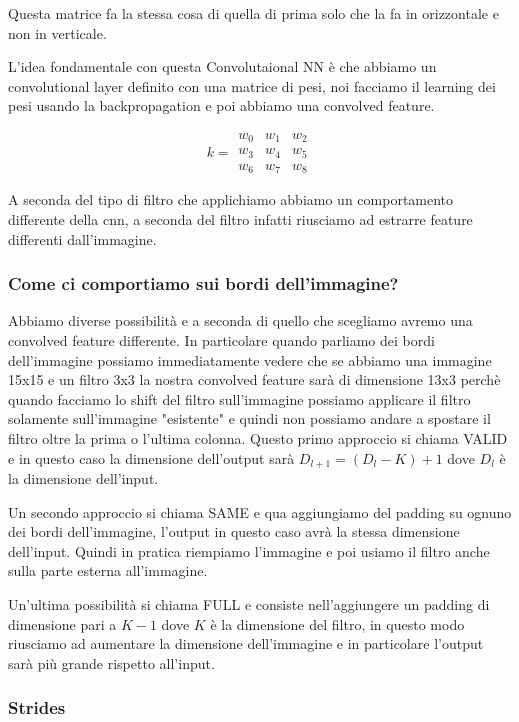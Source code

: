 \documentclass[14pt]{extreport}
\begin{document}
Questa matrice fa la stessa cosa di quella di prima solo che la fa in orizzontale e non in verticale.

L'idea fondamentale con questa Convolutaional NN è che abbiamo un convolutional layer definito con una matrice di pesi, noi facciamo il learning dei
pesi usando la backpropagation e poi abbiamo una convolved feature.

\begin{equation}
	k = \begin{matrix}
w_0 & w_1 & w_2\\
w_3 & w_4 & w_5\\
w_6 & w_7 & w_8
\end{matrix}
\end{equation}


A seconda del tipo di filtro che applichiamo abbiamo un comportamento differente della cnn, a seconda del filtro infatti riusciamo ad estrarre feature
differenti dall'immagine.

\subsubsection{Come ci comportiamo sui bordi dell'immagine?}

Abbiamo diverse possibilità e a seconda di quello che scegliamo avremo una convolved feature differente. In particolare quando parliamo dei bordi
dell'immagine possiamo immediatamente vedere che se abbiamo una immagine 15x15 e un filtro 3x3 la nostra convolved feature sarà di dimensione 13x3
perchè quando facciamo lo shift del filtro sull'immagine possiamo applicare il filtro solamente sull'immagine "esistente" e quindi non possiamo andare
a spostare il filtro oltre la prima o l'ultima colonna. Questo primo approccio si chiama VALID e in questo caso la dimensione dell'output sarà
$D_{l+1} = (D_l - K) + 1$ dove $D_l$ è la dimensione dell'input.

Un secondo approccio si chiama SAME e qua aggiungiamo del padding su ognuno dei bordi dell'immagine, l'output in questo caso avrà la stessa dimensione
dell'input. Quindi in pratica riempiamo l'immagine e poi usiamo il filtro anche sulla parte esterna all'immagine.

Un'ultima possibilità si chiama FULL e consiste nell'aggiungere un padding di dimensione pari a $K-1$ dove $K$ è la dimensione del filtro, in questo
modo riusciamo ad aumentare la dimensione dell'immagine e in particolare l'output sarà più grande rispetto all'input.


\subsubsection{Strides}
\end{document}
